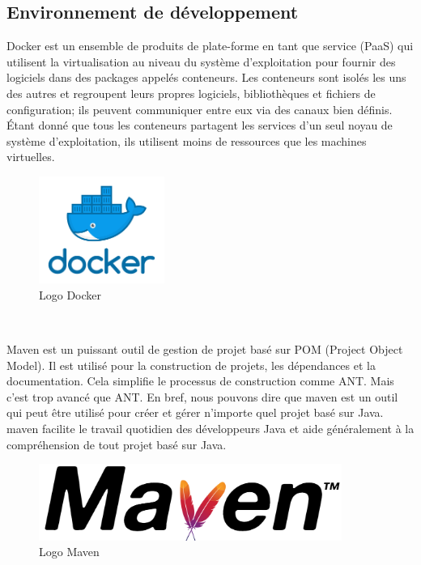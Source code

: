 \subsection{Environnement de développement}
Docker est un ensemble de produits de plate-forme en tant que service (PaaS) qui utilisent la virtualisation au niveau du système d'exploitation pour fournir des logiciels dans des packages appelés conteneurs. Les conteneurs sont isolés les uns des autres et regroupent leurs propres logiciels, bibliothèques et fichiers de configuration; ils peuvent communiquer entre eux via des canaux bien définis. Étant donné que tous les conteneurs partagent les services d'un seul noyau de système d'exploitation, ils utilisent moins de ressources que les machines virtuelles.
\\
\begin{figure}[!h]
\begin{center}
\includegraphics[height=3.5cm]{Pictures/docker.png}
\end{center}
\caption{Logo Docker}
\end{figure}
\newline
\\ \par 
Maven est un puissant outil de gestion de projet basé sur POM (Project Object Model). Il est utilisé pour la construction de projets, les dépendances et la documentation. Cela simplifie le processus de construction comme ANT. Mais c'est trop avancé que ANT.\newline
En bref, nous pouvons dire que maven est un outil qui peut être utilisé pour créer et gérer n'importe quel projet basé sur Java. maven facilite le travail quotidien des développeurs Java et aide généralement à la compréhension de tout projet basé sur Java.
\\
\begin{figure}[!h]
\begin{center}
\includegraphics[height=2.5cm]{Pictures/maven.png}
\end{center}
\caption{Logo Maven}
\end{figure}

